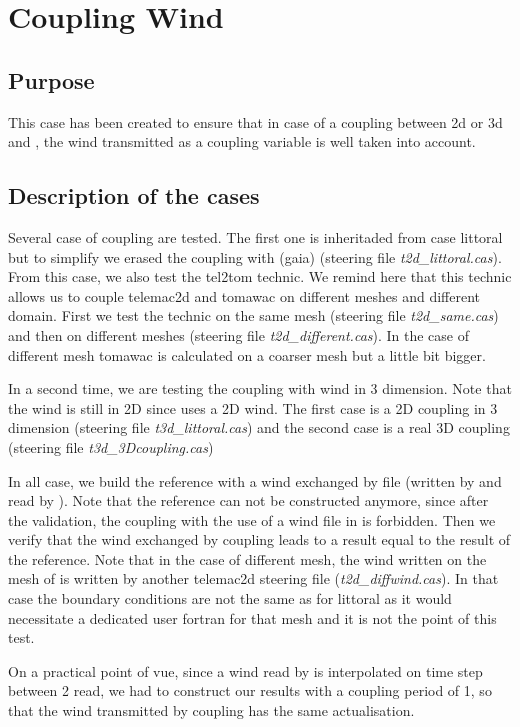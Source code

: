 \chapter{Coupling Wind}
\section{Purpose}
This case has been created to ensure that in case of a coupling between
\telemac2d or \telemac3d and \tomawac, the wind transmitted as a coupling
variable is well taken into account.

\section{Description of the cases}
  
Several case of coupling are tested. The first one is inheritaded from case
littoral but to simplify we erased the coupling with (gaia) (steering file
{\it t2d\_littoral.cas}). From this case, we also test the tel2tom technic. We
remind here that this technic allows us to couple telemac2d and tomawac on
different meshes and different domain. First we test the technic on the same mesh
(steering file {\it t2d\_same.cas}) and then on different meshes (steering file
{\it t2d\_different.cas}). In the case of different mesh tomawac is calculated on a
coarser mesh but a little bit bigger.

In a second time, we are testing the coupling with wind in 3 dimension.
Note that the wind is still in 2D since \tomawac uses a 2D wind. The first case is
a 2D coupling in 3 dimension (steering file {\it t3d\_littoral.cas}) and the second
case is a real 3D coupling (steering file {\it t3d\_3Dcoupling.cas})

In all case, we build the reference with a wind exchanged by file (written by
\telemac and read by \tomawac). Note that the reference can not be constructed
anymore, since after the validation, the coupling with the use of a wind file
in \tomawac is forbidden. Then we verify that the wind exchanged by coupling
leads to a result equal to the result of the reference. Note that in the case of
different mesh, the wind written on the mesh of \tomawac is written by another
telemac2d steering file ({\it t2d\_diffwind.cas}). In that case the boundary
conditions are not the same as for littoral as it would necessitate a dedicated
user fortran for that mesh and it is not the point of this test. 

On a practical point of vue, since a wind read by \tomawac is interpolated on time
step between 2 read, we had to construct our results with a coupling period of 1,
so that the wind transmitted by coupling has the same actualisation. 

